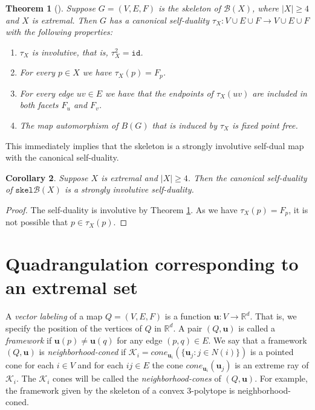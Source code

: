 \documentclass{article}
\newtheorem{theorem}{Theorem}[section]
\newtheorem{corollary}[theorem]{Corollary}
\newcounter{example}
\newcommand{\vu}[0]{\mathbf{u}}
\newcommand{\R}[0]{\mathbb{R}}
\newcommand{\Kc}[0]{\mathcal{K}}
\newcommand{\Bc}[0]{\mathcal{B}}
\newcommand{\skel}[0]{\mathtt{skel}}
\newcommand{\cone}[0]{cone}
\newcommand{\id}{\mathtt{id}}
\begin{document}
\begin{theorem}[\cite{kupitz2010ball}]\label{thm:canonicalselfduality}
    Suppose $G=(V,E,F)$ is the skeleton of $\Bc(X)$, where $|X|\ge 4$ and $X$ is extremal. Then $G$ has a canonical self-duality $\tau_X:V\cup E\cup F\rightarrow V\cup E\cup F$ with the following properties:
    \begin{enumerate}
        \item $\tau_X$ is involutive, that is, $\tau_X^2=\id$.
        \item For every $p\in X$ we have $\tau_X(p)=F_p$.
        \item For every edge $uv\in E$ we have that the endpoints of $\tau_X(uv)$ are included in both facets $F_u$ and $F_v$.
        \item The map automorphism of $B(G)$ that is induced by $\tau_X$ is fixed point free. 
    \end{enumerate}
\end{theorem}

This immediately implies that the skeleton is a strongly involutive self-dual map with the canonical self-duality.

\begin{corollary}\label{cor:canonicalissisd}
    Suppose $X$ is extremal and $|X|\ge 4$. Then the canonical self-duality of $\skel\Bc(X)$ is a strongly involutive self-duality.
\end{corollary}
\begin{proof}
    The self-duality is involutive by Theorem \ref{thm:canonicalselfduality}. As we have $\tau_X(p)=F_p$, it is not possible that $p\in\tau_X(p)$. 
\end{proof}


\section{Quadrangulation corresponding to an extremal set}\label{sec:quadofext}
A \emph{vector labeling} of a map  $Q=(V,E,F)$  is a function $\vu:V\rightarrow \R^d$. That is, we specify the position of the vertices of $Q$ in $\R^d$. A pair $(Q,\vu)$ is called a \emph{framework} if $\vu(p)\neq \vu(q)$ for any edge $(p,q)\in E$.  We say that a framework $(Q,\vu)$ is \emph{neighborhood-coned} if $\Kc_i=\cone_{\vu_i}(\{\vu_j:j\in N(i)\}) $ is a pointed cone for each $i\in V$ and for each $ij\in E$ the cone $\cone_{\vu_i}(\vu_j)$ is an extreme ray of $\Kc_i$. The $\Kc_i$ cones will be called the \emph{neighborhood-cones} of $(Q,\vu)$. For example, the framework given by the skeleton of a convex 3-polytope is neighborhood-coned. 
\end{document}
